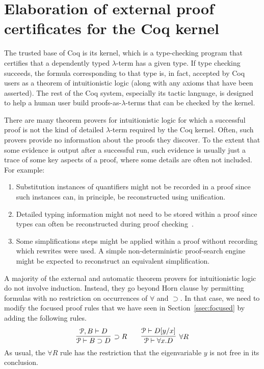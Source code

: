 \section{Elaboration of external proof certificates for the Coq kernel}
\label{sec:elab}

The trusted base of Coq is its kernel, which is a type-checking
program that certifies that a dependently typed $\lambda$-term has a
given type.  If type checking succeeds, the formula corresponding to
that type is, in fact, accepted by Coq users as a theorem of
intuitionistic logic (along with any axioms that have been asserted).
The rest of the Coq system, especially its tactic language, is
designed to help a human user build proofs-as-$\lambda$-terms that can
be checked by the kernel.

There are many theorem provers for intuitionistic logic
\cite{raths07jar} for which a successful proof is not the kind of
detailed $\lambda$-term required by the Coq kernel.  Often, such
provers provide no information about the proofs they discover.  To the
extent that some  evidence is output after a successful run, such
evidence is usually just a trace of some key aspects of a proof, where some
details are often not included.  For example:
\begin{enumerate}

\item Substitution instances of quantifiers might not be recorded in a
  proof since such instances can, in principle, be reconstructed using
  unification.

\item Detailed typing information might not need to be stored within a
  proof since types can often be reconstructed during proof
  checking~\cite{miller17fac}. 

\item Some simplifications steps might be applied within a proof
  without recording which rewrites were used.  A simple 
  non-deterministic proof-search engine might be expected to
  reconstruct an equivalent simplification.
\end{enumerate}
A majority of the external and automatic theorem provers for
intuitionistic logic do not involve induction.  Instead, they go
beyond Horn clause by permitting formulas with no restriction on
occurrences of $\forall$ and $\supset$.  In that case, we need to
modify the focused proof rules that we have seen in
Section~\ref{ssec:focused} by adding the following rules.
\[
  \infer[\supset R]{\Pscr\vdash B\supset D}{\Pscr, B\vdash D}
  \qquad
  \infer[\forall R]{\Pscr\vdash \forall x.D}{\Pscr\vdash D[y/x]}
\]
As usual, the $\forall R$ rule has the restriction that the
eigenvariable $y$ is not free in its conclusion.

